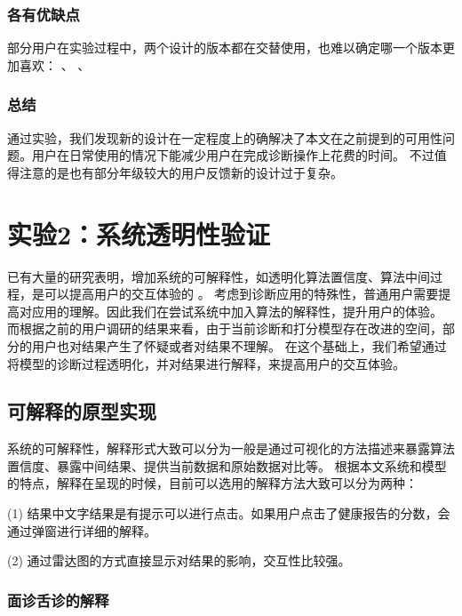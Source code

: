 \subsubsection{各有优缺点}
部分用户在实验过程中，两个设计的版本都在交替使用，也难以确定哪一个版本更加喜欢：
、
、

\subsubsection{总结}
通过实验，我们发现新的设计在一定程度上的确解决了本文在之前提到的可用性问题。用户在日常使用的情况下能减少用户在完成诊断操作上花费的时间。
不过值得注意的是也有部分年级较大的用户反馈新的设计过于复杂。

\section{实验2：系统透明性验证}

已有大量的研究表明，增加系统的可解释性，如透明化算法置信度、算法中间过程，是可以提高用户的交互体验的 \cite{wang2019designing}\cite{lim2009and}。
考虑到诊断应用的特殊性，普通用户需要提高对应用的理解。因此我们在尝试系统中加入算法的解释性，提升用户的体验。
而根据之前的用户调研的结果来看，由于当前诊断和打分模型存在改进的空间，部分的用户也对结果产生了怀疑或者对结果不理解。
在这个基础上，我们希望通过将模型的诊断过程透明化，并对结果进行解释，来提高用户的交互体验。

\subsection{可解释的原型实现}
系统的可解释性，解释形式大致可以分为一般是通过可视化的方法描述来暴露算法置信度、暴露中间结果、提供当前数据和原始数据对比等\cite{wang2019designing}。
根据本文系统和模型的特点\cite{kocielnik2019will}，解释在呈现的时候，目前可以选用的解释方法大致可以分为两种：

(1) 结果中文字结果是有提示可以进行点击。如果用户点击了健康报告的分数，会通过弹窗进行详细的解释。

(2) 通过雷达图的方式直接显示对结果的影响，交互性比较强。

\subsubsection{面诊舌诊的解释}

